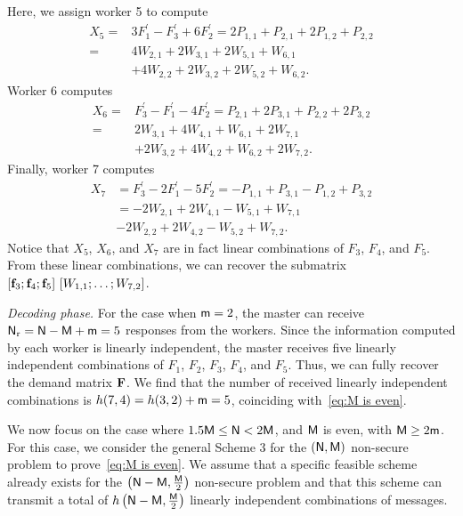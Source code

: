 \documentclass[conference,letterpaper]{IEEEtran}
\begin{document}
\begin{example}
Here, we assign worker 5 to compute
\begin{align*}
X_5 = & 3 F_1 ^{\prime} - F_3 ^{\prime} + 6F_2 ^{\prime} = 2P_{1,1} + P_{2,1} + 2P_{1,2} + P_{2,2} \\
    = & 4 W_{2,1} + 2W_{3,1} + 2W_{5,1} + W_{6,1} \\
    & + 4W_{2,2} + 2W_{3,2} + 2W_{5,2} + W_{6,2}.
\end{align*}
Worker 6 computes
\begin{align*}
X_6 = & F_3 ^{\prime} -  F_1 ^{\prime} - 4 F_2 ^{\prime} = P_{2,1} + 2P_{3,1} + P_{2,2} + 2P_{3,2} \\
    = & 2W_{3,1} + 4W_{4,1} + W_{6,1} + 2W_{7,1} \\
    & + 2W_{3,2} + 4W_{4,2} + W_{6,2} + 2W_{7,2}.
\end{align*}
Finally, worker 7 computes
\begin{align*}
X_7 &=  F_3 ^{\prime} - 2 F_1 ^{\prime} - 5F_2 ^{\prime} = -P_{1,1} + P_{3,1} - P_{1,2} + P_{3,2} \\
    &= -2W_{2,1} + 2W_{4,1} - W_{5,1} + W_{7,1} \\
    & - 2W_{2,2} + 2W_{4,2} - W_{5,2} + W_{7,2}.
\end{align*}
Notice that $X_5$, $X_6$, and $X_7$ are in fact linear combinations of $F_3$, $F_4$, and $F_5$. From these linear combinations, we can recover the submatrix $[{\bf f}_3; {\bf f}_4; {\bf f}_5] \ [ W_{1,1}; \ldots; W_{7,2} ]$.

{\it Decoding phase.}
For the case when ${\sf m} = 2$, the master can receive ${\sf N}_{\rm r} = {\sf N} - {\sf M} + {\sf m} = 5$ responses from the workers. Since the information computed by each worker is linearly independent, the master receives five linearly independent combinations of $F_1$, $F_2$, $F_3$, $F_4$, and $F_5$. Thus, we can fully recover the demand matrix ${\bf F}$.
We find that the number of received linearly independent combinations is $h(7, 4) = h(3, 2) + {\sf m} = 5$, coinciding with~\eqref{eq:M is even}.

\end{example}

We now focus on the case where $1.5 {\sf M} \leq {\sf N} < 2 {\sf M}$, and ${\sf M}$ is even, with ${\sf M} \geq 2{\sf m}$. For this case, we consider the general Scheme 3 for the $({\sf N}, {\sf M})$ non-secure problem to prove~\eqref{eq:M is even}. We assume that a specific feasible scheme already exists for the $\left({\sf N} - {\sf M}, \frac{{\sf M}}{2}\right)$ non-secure problem and that this scheme can transmit a total of $h\left({\sf N} - {\sf M}, \frac{{\sf M}}{2}\right)$ linearly independent combinations of messages.
\end{document}
